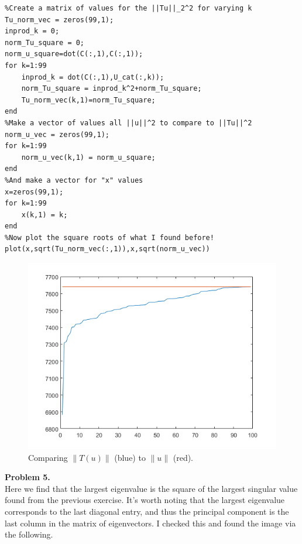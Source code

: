 \documentclass[leqno]{article}
\theoremstyle{nonumberplain}
\begin{document}
\begin{lstlisting}
%Create a matrix of values for the ||Tu||_2^2 for varying k
Tu_norm_vec = zeros(99,1);
inprod_k = 0;
norm_Tu_square = 0;
norm_u_square=dot(C(:,1),C(:,1));
for k=1:99
    inprod_k = dot(C(:,1),U_cat(:,k));
    norm_Tu_square = inprod_k^2+norm_Tu_square;
    Tu_norm_vec(k,1)=norm_Tu_square;
end
%Make a vector of values all ||u||^2 to compare to ||Tu||^2
norm_u_vec = zeros(99,1);
for k=1:99
    norm_u_vec(k,1) = norm_u_square;
end
%And make a vector for "x" values
x=zeros(99,1);
for k=1:99
    x(k,1) = k;
end
%Now plot the square roots of what I found before!
plot(x,sqrt(Tu_norm_vec(:,1)),x,sqrt(norm_u_vec))
\end{lstlisting}

\begin{figure}[h]
\begin{center}
\includegraphics[scale=.4]{norm_tu.png}
\caption{Comparing $\|T(u)\|$ (blue) to $\|u\|$ (red).}
\end{center}
\end{figure}

\pagebreak







\noindent\textbf{Problem 5.} \\
Here we find that the largest eigenvalue is the square of the largest singular value found from the previous exercise. It's worth noting that the largest eigenvalue corresponds to the last diagonal entry, and thus the principal component is the last column in the matrix of eigenvectors.  I checked this and found the image via the following.
\end{document}
